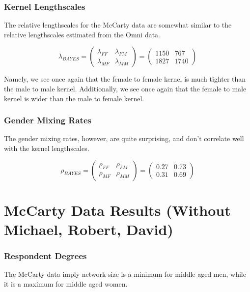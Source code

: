 \documentclass[12pt]{article}
\begin{document}
\subsubsection*{Kernel Lengthscales}
\noindent The relative lengthscales for the McCarty data are somewhat similar to the relative lengthscales estimated from the Omni data.

$$ \lambda_{BAYES}
= \left( \begin{array}{cc} \lambda_{FF} & \lambda_{FM} \\
\lambda_{MF} & \lambda_{MM} \end{array} \right) 
= \left( \begin{array}{cc}
1150 & 767 \\
1827 & 1740 \end{array} \right) $$ \vspace{7 pt}

\noindent Namely, we see once again that the female to female kernel is much tighter than the male to male kernel. Additionally, we see once again that the female to male kernel is wider than the male to female kernel.

\subsubsection*{Gender Mixing Rates}
\noindent The gender mixing rates, however, are quite surprising, and don't correlate well with the kernel lengthscales.

$$ \rho_{BAYES}
= \left( \begin{array}{cc} \rho_{FF} & \rho_{FM} \\
\rho_{MF} & \rho_{MM} \end{array} \right) 
= \left( \begin{array}{cc}
0.27 & 0.73 \\
0.31 & 0.69 \end{array} \right) $$

\pagebreak
\section{McCarty Data Results (Without Michael, Robert, David)}
\subsubsection*{Respondent Degrees}
The McCarty data imply network size is a minimum for middle aged men, while it is a maximum for middle aged women.
\end{document}
